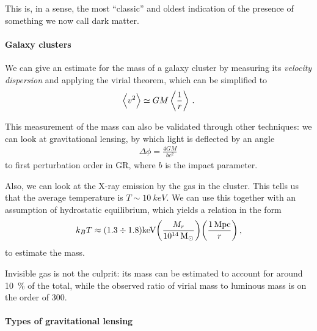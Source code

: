 \documentclass[main.tex]{subfiles}
\begin{document}
This is, in a sense, the most ``classic'' and oldest indication of the presence
of something we now call dark matter. 

\paragraph{Galaxy clusters}

We can give an estimate for the mass of a galaxy cluster by measuring its
\emph{velocity dispersion} and applying the virial theorem, which can be simplified to 
%
\begin{align}
\expval{v^2} \simeq GM \expval{ \frac{1}{r}}
\,.
\end{align}

This measurement of the mass can also be validated through other techniques: 
we can look at gravitational lensing, by which light is deflected by an angle 
%
\begin{align}
\Delta \phi = \frac{4GM}{bc^2}
\,
\end{align}
%
to first perturbation order in GR, where \(b\) is the impact parameter. 

Also, we can look at the X-ray emission by the gas in the cluster. 
This tells us that the average temperature is \(T \sim \SI{10}{keV}\). 
We can use this together with an assumption of hydrostatic equilibrium, which yields a relation in the form 
%
\begin{align}
k_B T \approx (1.3 \divisionsymbol 1.8)\SI{}{keV}
\qty(\frac{M_r}{\SI{e14}{M_{\odot}}}) 
\qty(\frac{\SI{1}{Mpc}}{r})
\,,
\end{align}
%
to estimate the mass. 


Invisible gas is not the culprit: its mass can be estimated to account for around 
\SI{10}{\percent} of the total, while the observed ratio of virial mass to luminous 
mass is on the order of 300.


\paragraph{Types of gravitational lensing}
\end{document}
